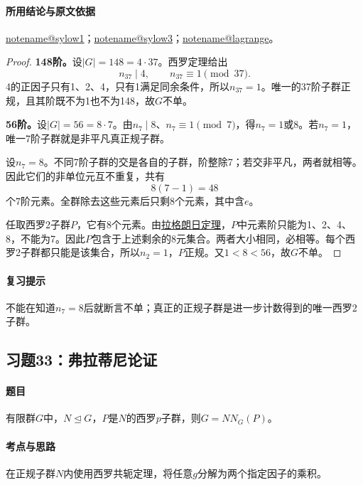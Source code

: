 \documentclass[UTF8,a4paper,11pt,fontset=windows]{ctexart}
\makeatletter
\newcommand{\noteref}[1]{\hyperref[note:#1]{\csname notename@#1\endcsname}}
\newcommand{\proofref}[2]{\hyperref[note:#1]{#2}}
\newcommand{\exref}[2]{\hyperref[ex:#1:#2]{第#1章习题#2}}
\makeatother
\begin{document}
\paragraph{所用结论与原文依据}
\noteref{sylow1}；\noteref{sylow3}；\noteref{lagrange}。


\begin{proof}
\textbf{148阶。}设$|G|=148=4\cdot37$。西罗定理给出
\[
n_{37}\mid4,\qquad n_{37}\equiv1\pmod{37}.
\]
4的正因子只有1、2、4，只有1满足同余条件，所以$n_{37}=1$。唯一的37阶子群正规，且其阶既不为1也不为148，故$G$不单。

\textbf{56阶。}设$|G|=56=8\cdot7$。由$n_7\mid8$、$n_7\equiv1\pmod7$，得$n_7=1$或8。若$n_7=1$，唯一7阶子群就是非平凡真正规子群。

设$n_7=8$。不同7阶子群的交是各自的子群，阶整除7；若交非平凡，两者就相等。因此它们的非单位元互不重复，共有
\[
8(7-1)=48
\]
个7阶元素。全群除去这些元素后只剩8个元素，其中含$e$。

任取西罗2子群$P$，它有8个元素。由\proofref{lagrange}{拉格朗日定理}，$P$中元素阶只能为1、2、4、8，不能为7。因此$P$包含于上述剩余的8元集合。两者大小相同，必相等。每个西罗2子群都只能是该集合，所以$n_2=1$，$P$正规。又$1<8<56$，故$G$不单。
\end{proof}

\paragraph{复习提示}
不能在知道$n_7=8$后就断言不单；真正的正规子群是进一步计数得到的唯一西罗2子群。


\subsection{习题33：\texorpdfstring{弗拉蒂尼论证}{弗拉蒂尼论证}}
\label{ex:2:33}

\paragraph{题目}
有限群$G$中，$N\trianglelefteq G$，$P$是$N$的西罗$p$子群，则$G=N N_G(P)$。

\paragraph{考点与思路}
在正规子群$N$内使用西罗共轭定理，将任意$g$分解为两个指定因子的乘积。
\end{document}
